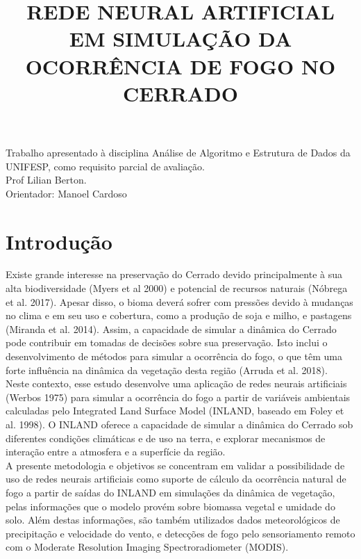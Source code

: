 \documentclass[conference]{IEEEtran}
\begin{document}
\title{REDE NEURAL ARTIFICIAL EM SIMULAÇÃO DA OCORRÊNCIA DE FOGO NO CERRADO }
\author{
}


\maketitle


 Trabalho apresentado à disciplina Análise de Algoritmo e Estrutura de Dados da UNIFESP, como requisito parcial de avaliação. \\Prof Lilian Berton.\\ Orientador: Manoel Cardoso





\section{Introdução}

Existe grande interesse na preservação do Cerrado devido principalmente à sua alta biodiversidade (Myers et al 2000) e potencial de recursos naturais (Nóbrega et al. 2017). Apesar disso, o bioma deverá sofrer com pressões devido à mudanças no clima e em seu uso e cobertura, como a produção de soja e milho, e pastagens (Miranda et al. 2014). Assim, a capacidade de simular a dinâmica do Cerrado pode contribuir em tomadas de decisões sobre sua preservação. Isto inclui o desenvolvimento de métodos para simular a ocorrência do fogo, o que têm uma forte influência na dinâmica da vegetação desta região (Arruda et al. 2018).\\
Neste contexto, esse estudo desenvolve uma aplicação de redes neurais artificiais (Werbos 1975) para simular a ocorrência do fogo a partir de variáveis ambientais calculadas pelo Integrated Land Surface Model (INLAND, baseado em Foley et al. 1998). O INLAND oferece a capacidade de simular a dinâmica do Cerrado sob diferentes condições climáticas e de uso na terra, e explorar mecanismos de interação entre a atmosfera e a superfície da região.\\
A presente metodologia e objetivos se concentram em validar a possibilidade de uso de redes neurais artificiais como suporte de cálculo da ocorrência natural de fogo a partir de saídas do INLAND em simulações da dinâmica de vegetação, pelas informações que o modelo provém sobre biomassa vegetal e umidade do solo. Além destas informações, são também utilizados dados meteorológicos de precipitação e velocidade do vento, e detecções de fogo pelo sensoriamento remoto com o Moderate Resolution Imaging Spectroradiometer (MODIS).
\end{document}
